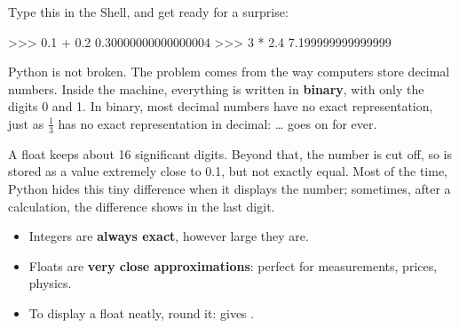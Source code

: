 
Type this in the Shell, and get ready for a surprise:

\begin{console}
>>> 0.1 + 0.2
0.30000000000000004
>>> 3 * 2.4
7.199999999999999
\end{console}

Python is not broken. The problem comes from the way computers store decimal numbers. Inside the
machine, everything is written in \textbf{binary}, with only the digits 0 and 1. In binary, most
decimal numbers have no exact representation, just as $\frac{1}{3}$ has no exact representation in
decimal: \ldots{} goes on for ever.

\begin{center}
\end{center}

A float keeps about 16 significant digits. Beyond that, the number is cut off, so  is stored
as a value extremely close to 0.1, but not exactly equal. Most of the time, Python hides this tiny
difference when it displays the number; sometimes, after a calculation, the difference shows in the
last digit.

\begin{regle}
\begin{itemize}
\item Integers are \textbf{always exact}, however large they are.
\item Floats are \textbf{very close approximations}: perfect for measurements, prices, physics.
\item To display a float neatly, round it:  gives .
\end{itemize}
\end{regle}

